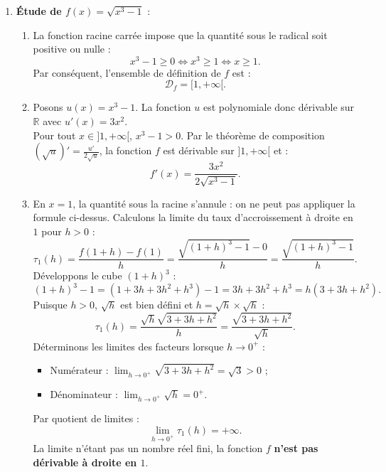 \documentclass[11pt,a4paper]{article}
\newcommand{\R}{\mathbb{R}}
\begin{document}
\begin{correctionbox}
\begin{enumerate}[label=\textbf{\arabic*.}]
    \item \textbf{Étude de $f(x) = \sqrt{x^3 - 1}$} :
    \begin{enumerate}[label=\alph*.]
        \item La fonction racine carrée impose que la quantité sous le radical soit positive ou nulle :
        \[
        x^3 - 1 \ge 0 \iff x^3 \ge 1 \iff x \ge 1.
        \]
        Par conséquent, l'ensemble de définition de $f$ est :
        \[
        \mathcal{D}_f = [1, +\infty[.
        \]

        \item Posons $u(x) = x^3 - 1$. La fonction $u$ est polynomiale donc dérivable sur $\R$ avec $u'(x) = 3x^2$.\\
        Pour tout $x \in ]1, +\infty[$, $x^3 - 1 > 0$.
        Par le théorème de composition $(\sqrt{u})' = \frac{u'}{2\sqrt{u}}$, la fonction $f$ est dérivable sur $]1, +\infty[$ et :
        \[
        f'(x) = \frac{3x^2}{2\sqrt{x^3 - 1}}.
        \]

        \item En $x = 1$, la quantité sous la racine s'annule : on ne peut pas appliquer la formule ci-dessus. Calculons la limite du taux d'accroissement à droite en $1$ pour $h > 0$ :
        \[
        \tau_1(h) = \frac{f(1+h) - f(1)}{h} = \frac{\sqrt{(1+h)^3 - 1} - 0}{h} = \frac{\sqrt{(1+h)^3 - 1}}{h}.
        \]
        Développons le cube $(1+h)^3$ :
        \[
        (1+h)^3 - 1 = (1 + 3h + 3h^2 + h^3) - 1 = 3h + 3h^2 + h^3 = h(3 + 3h + h^2).
        \]
        Puisque $h > 0$, $\sqrt{h}$ est bien défini et $h = \sqrt{h} \times \sqrt{h}$ :
        \[
        \tau_1(h) = \frac{\sqrt{h} \sqrt{3 + 3h + h^2}}{h} = \frac{\sqrt{3 + 3h + h^2}}{\sqrt{h}}.
        \]
        Déterminons les limites des facteurs lorsque $h \to 0^+$ :
        \begin{itemize}
            \item Numérateur : $\lim_{h \to 0^+} \sqrt{3 + 3h + h^2} = \sqrt{3} > 0$ ;
            \item Dénominateur : $\lim_{h \to 0^+} \sqrt{h} = 0^+$.
        \end{itemize}
        Par quotient de limites :
        \[
        \lim_{h \to 0^+} \tau_1(h) = +\infty.
        \]
        La limite n'étant pas un nombre réel fini, la fonction $f$ \textbf{n'est pas dérivable à droite en $1$}.


\end{enumerate}
\end{enumerate}
\end{correctionbox}
\end{document}
